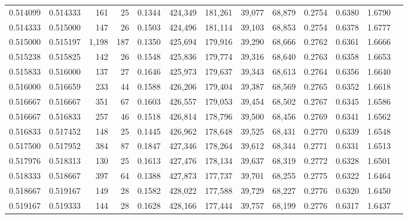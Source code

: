 \begin{tabular}{rrrrrrrrrrrrr}
0.514099 & 0.514333 &   161 &  25 &                                     0.1344 & 424,349 & 181,261 &  39,077 &  68,879 & 0.2754 & 0.6380 & 1.6790 \\
0.514333 & 0.515000 &   147 &  26 &                                     0.1503 & 424,496 & 181,114 &  39,103 &  68,853 & 0.2754 & 0.6378 & 1.6777 \\
0.515000 & 0.515197 & 1,198 & 187 &                                     0.1350 & 425,694 & 179,916 &  39,290 &  68,666 & 0.2762 & 0.6361 & 1.6666 \\
0.515238 & 0.515825 &   142 &  26 &                                     0.1548 & 425,836 & 179,774 &  39,316 &  68,640 & 0.2763 & 0.6358 & 1.6653 \\
0.515833 & 0.516000 &   137 &  27 &                                     0.1646 & 425,973 & 179,637 &  39,343 &  68,613 & 0.2764 & 0.6356 & 1.6640 \\
0.516000 & 0.516659 &   233 &  44 &                                     0.1588 & 426,206 & 179,404 &  39,387 &  68,569 & 0.2765 & 0.6352 & 1.6618 \\
0.516667 & 0.516667 &   351 &  67 &                                     0.1603 & 426,557 & 179,053 &  39,454 &  68,502 & 0.2767 & 0.6345 & 1.6586 \\
0.516667 & 0.516833 &   257 &  46 &                                     0.1518 & 426,814 & 178,796 &  39,500 &  68,456 & 0.2769 & 0.6341 & 1.6562 \\
0.516833 & 0.517452 &   148 &  25 &                                     0.1445 & 426,962 & 178,648 &  39,525 &  68,431 & 0.2770 & 0.6339 & 1.6548 \\
0.517500 & 0.517952 &   384 &  87 &                                     0.1847 & 427,346 & 178,264 &  39,612 &  68,344 & 0.2771 & 0.6331 & 1.6513 \\
0.517976 & 0.518313 &   130 &  25 &                                     0.1613 & 427,476 & 178,134 &  39,637 &  68,319 & 0.2772 & 0.6328 & 1.6501 \\
0.518333 & 0.518667 &   397 &  64 &                                     0.1388 & 427,873 & 177,737 &  39,701 &  68,255 & 0.2775 & 0.6322 & 1.6464 \\
0.518667 & 0.519167 &   149 &  28 &                                     0.1582 & 428,022 & 177,588 &  39,729 &  68,227 & 0.2776 & 0.6320 & 1.6450 \\
0.519167 & 0.519333 &   144 &  28 &                                     0.1628 & 428,166 & 177,444 &  39,757 &  68,199 & 0.2776 & 0.6317 & 1.6437 \\

\end{tabular}
